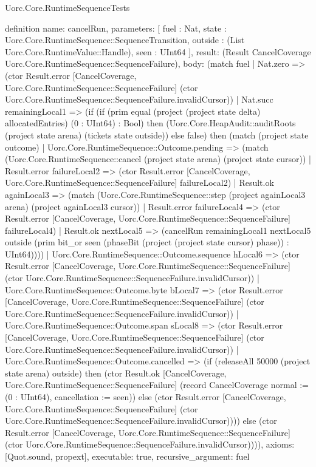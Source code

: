 \begin{lexlean}{Uorc.Core.RuntimeSequenceTests}
\begin{semanticmodule}
definition{
  name: cancelRun,
  parameters: [
    fuel : Nat,
    state : Uorc.Core.RuntimeSequence::SequenceTransition,
    outside : (List Uorc.Core.RuntimeValue::Handle),
    seen : UInt64
  ],
  result: (Result CancelCoverage Uorc.Core.RuntimeSequence::SequenceFailure),
  body: (match fuel
    | Nat.zero => (ctor Result.error [CancelCoverage, Uorc.Core.RuntimeSequence::SequenceFailure] (ctor Uorc.Core.RuntimeSequence::SequenceFailure.invalidCursor))
    | Nat.succ remainingLocal1 => (if (if (prim equal (project (project state delta) allocatedEntries) (0 : UInt64) : Bool) then (Uorc.Core.HeapAudit::auditRoots (project state arena) (tickets state outside)) else false) then (match (project state outcome)
      | Uorc.Core.RuntimeSequence::Outcome.pending => (match (Uorc.Core.RuntimeSequence::cancel (project state arena) (project state cursor))
        | Result.error failureLocal2 => (ctor Result.error [CancelCoverage, Uorc.Core.RuntimeSequence::SequenceFailure] failureLocal2)
        | Result.ok againLocal3 => (match (Uorc.Core.RuntimeSequence::step (project againLocal3 arena) (project againLocal3 cursor))
          | Result.error failureLocal4 => (ctor Result.error [CancelCoverage, Uorc.Core.RuntimeSequence::SequenceFailure] failureLocal4)
          | Result.ok nextLocal5 => (cancelRun remainingLocal1 nextLocal5 outside (prim bit_or seen (phaseBit (project (project state cursor) phase)) : UInt64))))
      | Uorc.Core.RuntimeSequence::Outcome.sequence hLocal6 => (ctor Result.error [CancelCoverage, Uorc.Core.RuntimeSequence::SequenceFailure] (ctor Uorc.Core.RuntimeSequence::SequenceFailure.invalidCursor))
      | Uorc.Core.RuntimeSequence::Outcome.byte bLocal7 => (ctor Result.error [CancelCoverage, Uorc.Core.RuntimeSequence::SequenceFailure] (ctor Uorc.Core.RuntimeSequence::SequenceFailure.invalidCursor))
      | Uorc.Core.RuntimeSequence::Outcome.span sLocal8 => (ctor Result.error [CancelCoverage, Uorc.Core.RuntimeSequence::SequenceFailure] (ctor Uorc.Core.RuntimeSequence::SequenceFailure.invalidCursor))
      | Uorc.Core.RuntimeSequence::Outcome.cancelled => (if (releaseAll 50000 (project state arena) outside) then (ctor Result.ok [CancelCoverage, Uorc.Core.RuntimeSequence::SequenceFailure] (record CancelCoverage {normal := (0 : UInt64), cancellation := seen})) else (ctor Result.error [CancelCoverage, Uorc.Core.RuntimeSequence::SequenceFailure] (ctor Uorc.Core.RuntimeSequence::SequenceFailure.invalidCursor)))) else (ctor Result.error [CancelCoverage, Uorc.Core.RuntimeSequence::SequenceFailure] (ctor Uorc.Core.RuntimeSequence::SequenceFailure.invalidCursor)))),
  axioms: [Quot.sound, propext],
  executable: true,
  recursive_argument: fuel
}


\end{semanticmodule}
\end{lexlean}
